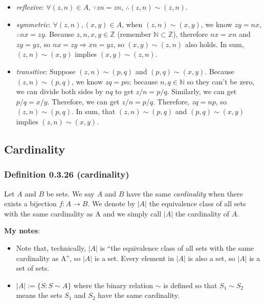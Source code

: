 \documentclass[12pt, letterpaper, oneside]{book}
\begin{document}
\begin{itemize}
  \item \textit{reflexive}: $\forall (z, n) \in A$, $\because zn = zn$,
    $\therefore (z, n) \sim (z, n)$.
  \item \textit{symmetric}: $\forall (z, n), (x, y) \in A$, when $(z, n) \sim
    (x, y)$, we know $zy = nx$, $\therefore nx = zy$. Because $z, n, x, y \in
    \mathbb{Z}$ (remember $\mathbb{N} \subset \mathbb{Z}$), therefore $nx = xn$
    and $zy = yz$, so $nx = zy \Rightarrow xn = yz$, so $(x, y) \sim (z, n)$
    also holds. In sum, $(z, n) \sim (x, y)$ implies $(x, y) \sim (z, n)$.
  \item \textit{transitive}: Suppose $(z, n) \sim (p, q)$ and $(p, q) \sim
    (x, y)$. Because $(z, n) \sim (p, q)$, we know $zq = pn$; because $n, q \in
    \mathbb{N}$ so they can't be zero, we can divide both sides by $nq$ to get
    $z/n = p/q$. Similarly, we can get $p/q = x/y$. Therefore, we can get $z/n
    = p/q$. Therefore, $zq = np$, so $(z, n) \sim (p, q)$. In sum, that $(z, n)
    \sim (p, q)$ and $(p, q) \sim (x, y)$ implies $(z, n) \sim (x, y)$.
\end{itemize}

\subsection{Cardinality}

\subsubsection{Definition 0.3.26 (cardinality)}

Let $A$ and $B$ be sets. We say $A$ and $B$ have the same \textit{cardinality}
when there exists a bijection $f: A \rightarrow B$. We denote by $|A|$ the
equivalence class of all sets with the same cardinality as A and we simply call
$|A|$ the cardinality of $A$.

\colorbox{lime!100}{\textbf{My notes}}:
\begin{itemize}
  \item Note that, technically, $|A|$ is ``the equivalence class of all sets
    with the same cardinality as A'', so $|A|$ is a set. Every element in $|A|$
    is also a set, so $|A|$ is a set of sets.
  \item $|A|:= \{S: S \sim A\}$ where the binary relation $\sim$ is defined so
    that $S_1 \sim S_2$ means the sets $S_1$ and $S_2$ have the same
    cardinality.
\end{itemize}
\end{document}
